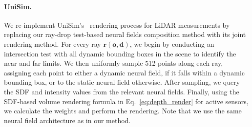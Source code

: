 \paragraph{UniSim.} 
We re-implement UniSim's~\cite{yang2023unisim} rendering process for LiDAR measurements by replacing our ray-drop test-based neural fields composition method with its joint rendering method. For every ray $\mathbf{r} (\mathbf{o},\mathbf{d})$, we begin by conducting an intersection test with all dynamic bounding boxes in the scene to identify the near and far limits. We then uniformly sample 512 points along each ray, assigning each point to either a dynamic neural field, if it falls within a dynamic bounding box, or to the static neural field otherwise. After sampling, we query the SDF and intensity values from the relevant neural fields. Finally, using the SDF-based volume rendering formula in Eq.~\ref{eq:depth_render} for active sensors, we calculate the weights and perform the rendering. Note that we use the same neural field architecture as in our method.



